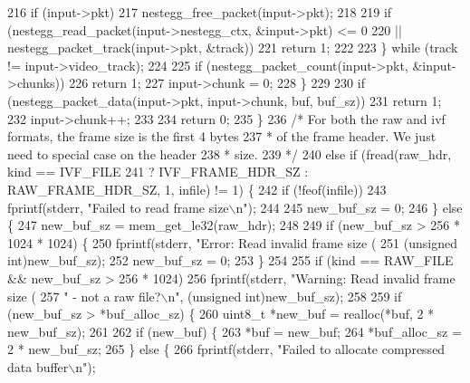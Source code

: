 \begin{DoxyCodeInclude}
{{{{{216         \textcolor{keywordflow}{if} (input->pkt)
217           nestegg\_free\_packet(input->pkt);
218 
219         \textcolor{keywordflow}{if} (nestegg\_read\_packet(input->nestegg\_ctx, &input->pkt) <= 0
220             || nestegg\_packet\_track(input->pkt, &track))
221           \textcolor{keywordflow}{return} 1;
222 
223       \} \textcolor{keywordflow}{while} (track != input->video\_track);
224 
225       \textcolor{keywordflow}{if} (nestegg\_packet\_count(input->pkt, &input->chunks))
226         \textcolor{keywordflow}{return} 1;
227       input->chunk = 0;
228     \}
229 
230     \textcolor{keywordflow}{if} (nestegg\_packet\_data(input->pkt, input->chunk, buf, buf\_sz))
231       \textcolor{keywordflow}{return} 1;
232     input->chunk++;
233 
234     \textcolor{keywordflow}{return} 0;
235   \}
236   \textcolor{comment}{/* For both the raw and ivf formats, the frame size is the first 4 bytes}
237 \textcolor{comment}{   * of the frame header. We just need to special case on the header}
238 \textcolor{comment}{   * size.}
239 \textcolor{comment}{   */}
240   \textcolor{keywordflow}{else} \textcolor{keywordflow}{if} (fread(raw\_hdr, kind == IVF\_FILE
241                  ? IVF\_FRAME\_HDR\_SZ : RAW\_FRAME\_HDR\_SZ, 1, infile) != 1) \{
242     \textcolor{keywordflow}{if} (!feof(infile))
243       fprintf(stderr, \textcolor{stringliteral}{"Failed to read frame size\(\backslash\)n"});
244 
245     new\_buf\_sz = 0;
246   \} \textcolor{keywordflow}{else} \{
247     new\_buf\_sz = mem\_get\_le32(raw\_hdr);
248 
249     \textcolor{keywordflow}{if} (new\_buf\_sz > 256 * 1024 * 1024) \{
250       fprintf(stderr, \textcolor{stringliteral}{"Error: Read invalid frame size (%
251               (\textcolor{keywordtype}{unsigned} \textcolor{keywordtype}{int})new\_buf\_sz);
252       new\_buf\_sz = 0;
253     \}
254 
255     \textcolor{keywordflow}{if} (kind == RAW\_FILE && new\_buf\_sz > 256 * 1024)
256       fprintf(stderr, \textcolor{stringliteral}{"Warning: Read invalid frame size (%
257               \textcolor{stringliteral}{" - not a raw file?\(\backslash\)n"}, (\textcolor{keywordtype}{unsigned} \textcolor{keywordtype}{int})new\_buf\_sz);
258 
259     \textcolor{keywordflow}{if} (new\_buf\_sz > *buf\_alloc\_sz) \{
260       uint8\_t *new\_buf = realloc(*buf, 2 * new\_buf\_sz);
261 
262       \textcolor{keywordflow}{if} (new\_buf) \{
263         *buf = new\_buf;
264         *buf\_alloc\_sz = 2 * new\_buf\_sz;
265       \} \textcolor{keywordflow}{else} \{
266         fprintf(stderr, \textcolor{stringliteral}{"Failed to allocate compressed data buffer\(\backslash\)n"});
}}}}}}}
\end{DoxyCodeInclude}
